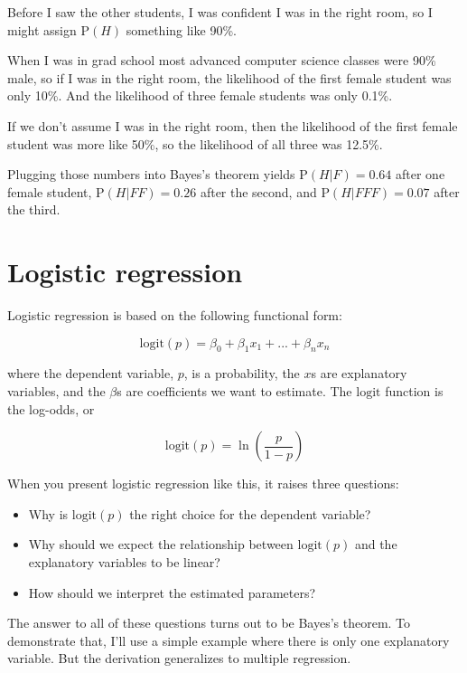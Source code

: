 \documentclass[12pt]{article}
\newcommand{\logit}{\mathrm{logit}}
\renewcommand{\P}{\mathrm{P}}
\begin{document}
Before I saw the other students, I was confident I was in the right
room, so I might assign $\P(H)$ something like 90\%.

When I was in grad school most advanced computer science classes were
90\% male, so if I was in the right room, the likelihood of the
first female student was only 10\%.  And the likelihood of three
female students was only 0.1\%.

If we don't assume I was in the right room, then the likelihood of
the first female student was more like 50\%, so the likelihood
of all three was 12.5\%.

Plugging those numbers into Bayes's theorem yields $\P(H|F) = 0.64$
after one female student, $\P(H|FF) = 0.26$ after the second,
and $\P(H|FFF) = 0.07$ after the third.


\section{Logistic regression}

Logistic regression is based on the following functional form:

\[ \logit(p) = \beta_0 + \beta_1 x_1 + ... + \beta_n x_n \]

where the dependent variable, $p$, is a probability,
the $x$s are explanatory variables, and the $\beta$s are
coefficients we want to estimate.  The $\logit$ function is the
log-odds, or

\[ \logit(p) = \ln \left( \frac{p}{1-p} \right) \]

When you present logistic regression like this, it raises
three questions:

\begin{itemize}

\item Why is $\logit(p)$ the right choice for the dependent
variable?

\item Why should we expect the relationship between $\logit(p)$
and the explanatory variables to be linear?

\item How should we interpret the estimated parameters?

\end{itemize}

The answer to all of these questions turns out to be Bayes's
theorem.  To demonstrate that, I'll use a simple example where
there is only one explanatory variable.  But the derivation
generalizes to multiple regression.
\end{document}
